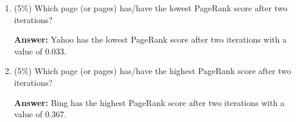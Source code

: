 \documentclass[11pt]{article}
\begin{document}
\begin{enumerate}
\begin{enumerate}
            \item (5\%) Which page (or pages) has/have the lowest PageRank score after two iterations?

            \textbf{Answer:} Yahoo has the lowest PageRank score after two iterations with a value of 0.033.

            \item (5\%) Which page (or pages) has/have the highest PageRank score after two iterations?

            \textbf{Answer:} Bing has the highest PageRank score after two iterations with a value of 0.367.

        \end{enumerate}

    \end{enumerate}
\end{document}
